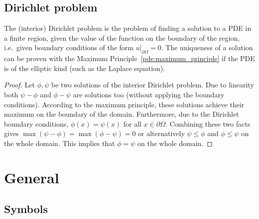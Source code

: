 \subsection{Dirichlet problem}

    The (interior) Dirichlet problem is the problem of finding a solution to a PDE in a finite region, given the value of the function on the boundary of the region, i.e.~given boundary conditions of the form $u|_{\partial\Omega}=0$. The uniqueness of a solution can be proven with the Maximum Principle~\ref{pde:maximum_principle} if the PDE is of the elliptic kind (such as the Laplace equation).
    \begin{proof}
        Let $\phi,\psi$ be two solutions of the interior Dirichlet problem. Due to linearity both $\psi-\phi$ and $\phi-\psi$ are solutions too (without applying the boundary conditions). According to the maximum principle, these solutions achieve their maximum on the boundary of the domain. Furthermore, due to the Dirichlet boundary conditions, $\phi(x)=\psi(x)$ for all $x\in\partial\Omega$. Combining these two facts gives $\max(\psi-\phi) = \max(\phi-\psi) = 0$ or alternatively $\psi\leq\phi$ and $\phi\leq\psi$ on the whole domain. This implies that $\phi=\psi$ on the whole domain.
    \end{proof}



\section{General}\label{section:pde_general}
\subsection{Symbols}

